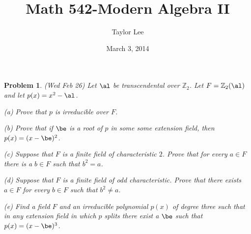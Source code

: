 \documentclass[12pt]{article}
\theoremstyle{moo}
\newtheorem*{prob}{Problem}
\def\zz{{\mathbb Z}}
\begin{document}
\fontseries {\seriesdefault}
\fontshape {\shapedefault}
\selectfont

\title{ Math 542-Modern Algebra II}
\date{March 3, 2014}         %
\author{Taylor Lee}      %
\maketitle                      %




\begin{prob}
(Wed Feb 26) Let $\al$ be transcendental over $\zz_2$.  Let
$F=\zz_2(\al)$ and let $p(x)=x^2-\al$.  
\par (a) Prove that $p$ is irreducible over $F$.
\par (b) Prove that if $\be$ is a root of $p$ in some
some extension field, then $p(x)=(x-\be)^2$.
\par (c) Suppose that $F$ is a finite field of characteristic $2$.
Prove that for every $a\in F$ there is a $b\in F$ such that $b^2=a$.
\par (d)  Suppose that $F$ is a finite field of odd characteristic.
Prove that there exists $a\in F$ for every $b\in F$ such that $b^2\neq a$.
\par (e) Find a field $F$ and an irreducible polynomial $p(x)$ of
degree three such that in any extension field in which $p$ splits
there exist a $\be$ such that $p(x)=(x-\be)^3$.
\end{prob}
\end{document}
